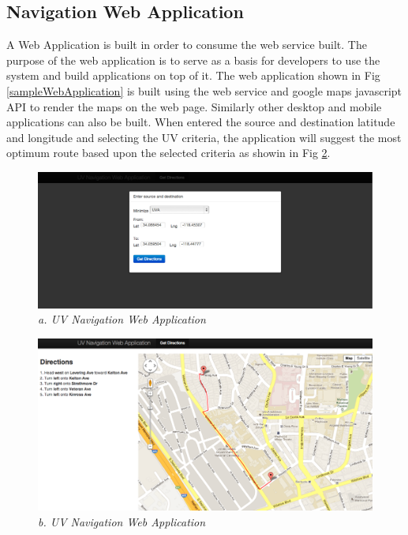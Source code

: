 \documentclass[12pt,fullpage,doublespace]{article}
\begin{document}
\subsection{Navigation Web Application}
A Web Application is built in order to consume the web service built. The purpose of the web application is to serve as a basis for developers to use the system and build applications on top of it. The web application shown in Fig \ref{sampleWebApplication} is built using the web service and google maps javascript API to render the maps on the web page. Similarly other desktop and mobile applications can also be built. When entered the source and destination latitude and longitude and selecting the UV criteria, the application will suggest the most optimum route based upon the selected criteria as showin in Fig \ref{fig:webapp}.
\begin{figure}[ht]
\begin{center}
\includegraphics[scale=0.30]{webapp1.png}
\caption{\small \sl a. UV Navigation Web Application }
\label{fig:webapp}
\end{center}
\end{figure}
\begin{figure}[ht]
\begin{center}
\includegraphics[scale=0.35]{webapp2.png}
\caption{\small \sl b. UV Navigation Web Application }
\label{fig:webapp}
\end{center}
\end{figure}
\clearpage
\newpage
\end{document}
